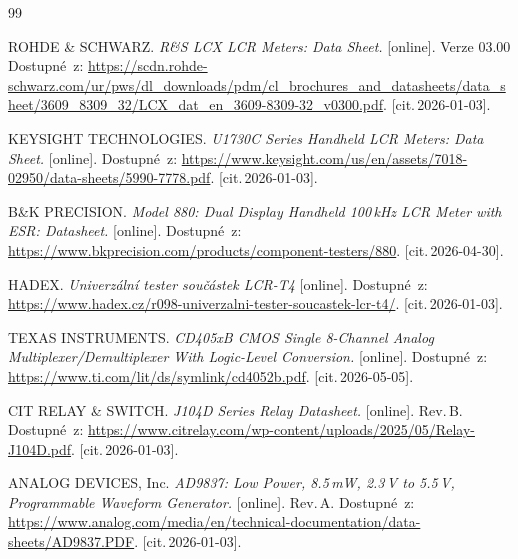 \begin{thebibliography}{99}

	ROHDE \& SCHWARZ.
	\emph{R\&S LCX LCR Meters: Data Sheet.} [online].
	Verze 03.00
	Dostupné~z: \url{https://scdn.rohde-schwarz.com/ur/pws/dl_downloads/pdm/cl_brochures_and_datasheets/data_sheet/3609_8309_32/LCX_dat_en_3609-8309-32_v0300.pdf}. [cit.\,2026-01-03].

	KEYSIGHT TECHNOLOGIES.
	\emph{U1730C Series Handheld LCR Meters: Data Sheet.} [online].
	Dostupné~z: \url{https://www.keysight.com/us/en/assets/7018-02950/data-sheets/5990-7778.pdf}. [cit.\,2026-01-03].

	B\&K PRECISION.
	\emph{Model 880: Dual Display Handheld 100\,kHz LCR Meter with ESR: Datasheet.} [online].
	Dostupné~z: \url{https://www.bkprecision.com/products/component-testers/880}. [cit.\,2026-04-30].

	HADEX.
	\emph{Univerzální tester součástek LCR-T4} [online].
	Dostupné~z: \url{https://www.hadex.cz/r098-univerzalni-tester-soucastek-lcr-t4/}. [cit.\,2026-01-03].


	TEXAS INSTRUMENTS.
	\emph{CD405xB CMOS Single 8-Channel Analog Multiplexer/Demultiplexer With Logic-Level Conversion.} [online].
	Dostupné~z: \url{https://www.ti.com/lit/ds/symlink/cd4052b.pdf}. [cit.\,2026-05-05].

	CIT RELAY \& SWITCH.
	\emph{J104D Series Relay Datasheet.} [online].
	Rev.\,B.
	Dostupné~z: \url{https://www.citrelay.com/wp-content/uploads/2025/05/Relay-J104D.pdf}. [cit.\,2026-01-03].

	ANALOG DEVICES, Inc.
	\emph{AD9837: Low Power, 8.5\,mW, 2.3\,V to 5.5\,V, Programmable Waveform Generator.} [online].
	Rev.\,A.
	Dostupné~z: \url{https://www.analog.com/media/en/technical-documentation/data-sheets/AD9837.PDF}. [cit.\,2026-01-03].



\end{thebibliography}
